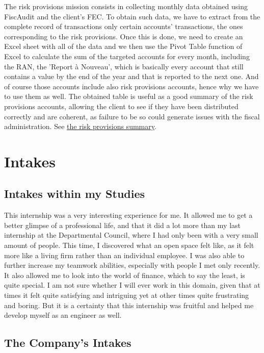 \documentclass[12pt]{article}
\begin{document}
The risk provisions mission consists in collecting monthly data obtained using FiscAudit and the client's FEC. To obtain such data, we have to extract from the complete record of transactions only certain accounts' transactions, the ones corresponding to the risk provisions. Once this is done, we need to create an Excel sheet with all of the data and we then use the Pivot Table function of Excel to calculate the sum of the targeted accounts for every month, including the RAN, the 'Report à Nouveau', which is basically every account that still contains a value by the end of the year and that is reported to the next one. And of course those accounts include also risk provisions accounts, hence why we have to use them as well. The obtained table is useful as a good summary of the risk provisions accounts, allowing the client to see if they have been distributed correctly and are coherent, as failure to be so could generate issues with the fiscal administration. See \hyperref[prov]{the risk provisions summary}.

\section{Intakes}
\subsection{Intakes within my Studies}

This internship was a very interesting experience for me. It allowed me to get a better glimpse of a professional life, and that it did a lot more than my last internship at the Departmental Council, where I had only been with a very small amount of people. This time, I discovered what an open space felt like, as it felt more like a living firm rather than an individual employee. I was also able to further increase my teamwork abilities, especially with people I met only recently. It also allowed me to look into the world of finance, which to say the least, is quite special. I am not sure whether I will ever work in this domain, given that at times it felt quite satisfying and intriguing yet at other times quite frustrating and boring. But it is a certainty that this internship was fruitful and helped me develop myself as an engineer as well. 

\subsection{The Company's Intakes}
\end{document}
